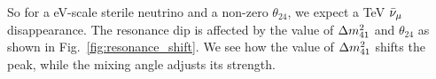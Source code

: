 So for a \si{\eV}-scale sterile neutrino and a non-zero $\theta_{24}$, we expect a \si{\TeV} $\bar{\nu}_\mu$ disappearance.
The resonance dip is affected by the value of $\dm[41]$ and $\theta_{24}$ as shown in Fig.~\ref{fig:resonance_shift}.
We see how the value of $\dm[41]$ shifts the peak, while the mixing angle adjusts its strength. 


